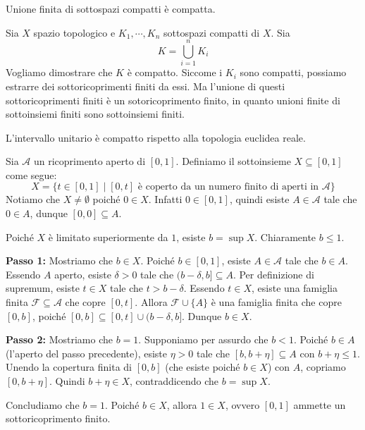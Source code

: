 \documentclass[a4paper]{article}
\begin{document}
\begin{snippetproposition}{}
    Unione finita di sottospazi compatti è compatta.
\end{snippetproposition}

\begin{snippetproof}{}
    Sia \(X\) spazio topologico e \(K_1, \cdots, K_n\)
    sottospazi compatti di \(X\).
    Sia
    \[
        K = \bigcup_{i=1}^n K_i
    \]
    Vogliamo dimostrare che \(K\) è compatto.
    Siccome i \(K_i\) sono compatti, possiamo estrarre
    dei sottoricoprimenti finiti da essi. Ma l'unione di questi
    sottoricoprimenti finiti è un sotoricoprimento finito,
    in quanto unioni finite di sottoinsiemi finiti sono sottoinsiemi finiti.
\end{snippetproof}

\pagebreak

\begin{snippettheorem}{}
    L'intervallo unitario è compatto
    rispetto alla topologia euclidea reale.
\end{snippettheorem}

\begin{snippetproof}{}
    Sia \(\mathcal{A}\) un ricoprimento aperto di \([0,1]\).
    Definiamo il sottoinsieme \(X \subseteq [0, 1]\) come segue:
    \[
        X = \{t \in [0, 1] \mid [0,t] \text{ è coperto da un numero finito di aperti in } \mathcal{A}\}
    \]
    Notiamo che \(X \neq \emptyset\) poiché \(0 \in X\). Infatti \(0 \in [0,1]\), quindi esiste \(A \in \mathcal{A}\) tale che \(0 \in A\), dunque \([0,0] \subseteq A\).
    
    Poiché \(X\) è limitato superiormente da \(1\), esiste \(b = \sup X\). Chiaramente \(b \leq 1\).
    
    \textbf{Passo 1:} Mostriamo che \(b \in X\).
    Poiché \(b \in [0,1]\), esiste \(A \in \mathcal{A}\) tale che \(b \in A\). Essendo \(A\) aperto, esiste \(\delta > 0\) tale che \((b-\delta, b] \subseteq A\).
    Per definizione di supremum, esiste \(t \in X\) tale che \(t > b - \delta\).
    Essendo \(t \in X\), esiste una famiglia finita \(\mathcal{F} \subseteq \mathcal{A}\) che copre \([0,t]\).
    Allora \(\mathcal{F} \cup \{A\}\) è una famiglia finita che copre \([0,b]\), poiché \([0,b] \subseteq [0,t] \cup (b-\delta, b]\). Dunque \(b \in X\).
    
    \textbf{Passo 2:} Mostriamo che \(b = 1\).
    Supponiamo per assurdo che \(b < 1\). Poiché \(b \in A\) (l'aperto del passo precedente), esiste \(\eta > 0\) tale che \([b, b+\eta] \subseteq A\) con \(b+\eta \le 1\).
    Unendo la copertura finita di \([0,b]\) (che esiste poiché \(b \in X\)) con \(A\), copriamo \([0, b+\eta]\).
    Quindi \(b+\eta \in X\), contraddicendo che \(b = \sup X\).
    
    Concludiamo che \(b=1\). Poiché \(b \in X\), allora \(1 \in X\), ovvero \([0,1]\) ammette un sottoricoprimento finito.
\end{snippetproof}
\end{document}
